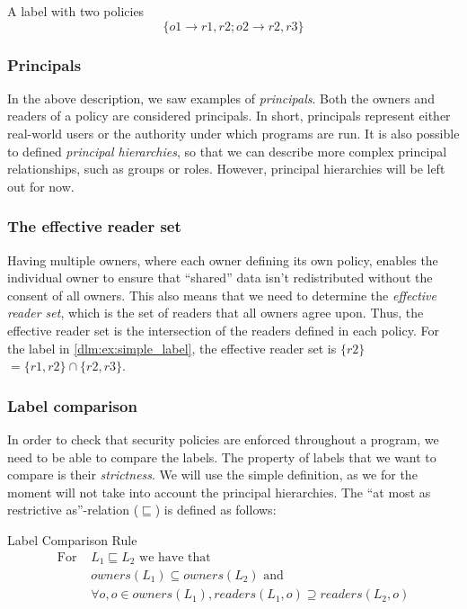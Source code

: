 \begin{example}{A label with two policies}\label{dlm:ex:simple_label}
  \[\{o1 \rightarrow r1, r2; o2 \rightarrow r2, r3\}\]
\end{example}

\subsubsection{Principals}
In the above description, we saw examples of \emph{principals}.
Both the owners and readers of a policy are considered principals.
In short, principals represent either real-world users or the authority under which programs are run.
It is also possible to defined \emph{principal hierarchies}, so that we can describe more complex principal relationships, such as groups or roles.
However, principal hierarchies will be left out for now.

\subsubsection{The effective reader set}
Having multiple owners, where each owner defining its own policy, enables the individual owner to ensure that ``shared'' data isn't redistributed without the consent of all owners.
This also means that we need to determine the \emph{effective reader set}, which is the set of readers that all owners agree upon.
Thus, the effective reader set is the intersection of the readers defined in each policy.
For the label in \cref{dlm:ex:simple_label}, the effective reader set is $\{r2\}$ $= \{r1,r2\} \cap \{r2, r3\}$.

\subsubsection{Label comparison}
In order to check that security policies are enforced throughout a program, we need to be able to compare the labels.
The property of labels that we want to compare is their \emph{strictness}.
We will use the simple definition\cite{myers1997}, as we for the moment will not take into account the principal hierarchies.
The ``at most as restrictive as''-relation ($\sqsubseteq$) is defined as follows:

\begin{definition}{Label Comparison Rule}
  \begin{align}
    \text{For } & L_1 \sqsubseteq L_2 \text{ we have that} \nonumber \\
    & owners(L_1) \subseteq owners(L_2) \text{ and} \nonumber \\
    & \forall o, o \in owners(L_1), readers(L_1, o) \supseteq readers(L_2, o) \nonumber
  \end{align}
\end{definition}

